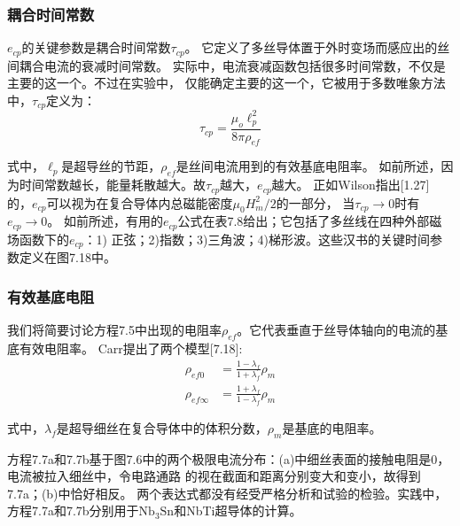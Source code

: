 \subsubsection*{耦合时间常数}
$e_{cp}$的关键参数是耦合时间常数$\tau_{cp}$。
它定义了多丝导体置于外时变场而感应出的丝间耦合电流的衰减时间常数。
实际中，电流衰减函数包括很多时间常数，不仅是主要的这一个。不过在实验中，
仅能确定主要的这一个，它被用于多数唯象方法中，$\tau_{cp}$定义为：
\begin{equation}%
\tau_{cp}=\frac{\mu_o\ell_{p}^{2}}{8\pi\rho_{ef}}
\end{equation}

式中，$\ell_p$是超导丝的节距，$\rho_{ef}$是丝间电流用到的有效基底电阻率。
如前所述，因为时间常数越长，能量耗散越大。故$\tau_{cp}$越大，$e_{cp}$越大。
正如Wilson指出[1.27]的，$e_{cp}$可以视为在复合导体内总磁能密度$\mu_0 H_m^2/2$的一部分，
当$\tau_{cp}\rightarrow 0$时有$e_{cp}\rightarrow 0$。
如前所述，有用的$e_{cp}$公式在表7.8给出；它包括了多丝线在四种外部磁场函数下的$e_{cp}$：1)
正弦；2)指数；3)三角波；4)梯形波。这些汉书的关键时间参数定义在图7.18中。

\subsubsection*{有效基底电阻}
我们将简要讨论方程7.5中出现的电阻率$\rho_{ef}$。它代表垂直于丝导体轴向的电流的基底有效电阻率。
Carr提出了两个模型[7.18]:
\begin{subequations}
	\begin{align}
	\rho_{ef0}&=\frac{1-\lambda_f}{1+\lambda_f}\rho_m\\
	\rho_{ef\infty}&=\frac{1+\lambda_f}{1-\lambda_f}\rho_m
	\end{align}
\end{subequations}

式中，$\lambda_f$是超导细丝在复合导体中的体积分数，$\rho_m$是基底的电阻率。

方程7.7a和7.7b基于图7.6中的两个极限电流分布：(a)中细丝表面的接触电阻是0，电流被拉入细丝中，令电路通路
的视在截面和距离分别变大和变小，故得到7.7a；(b)中恰好相反。
两个表达式都没有经受严格分析和试验的检验。实践中，方程7.7a和7.7b分别用于$\mathrm{Nb_3Sn}$和NbTi超导体的计算。

